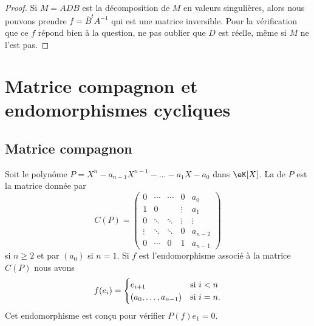 \begin{proof}
    Si \( M=ADB\) est la décomposition de \( M\) en valeurs singulières, alors nous pouvons prendre \( f=\overline{ B }^tA^{-1}\) qui est une matrice inversible. Pour la vérification que ce \( f\) répond bien à la question, ne pas oublier que \( D\) est réelle, même si \( M\) ne l'est pas.
\end{proof}

\section{Matrice compagnon et endomorphismes cycliques}

\subsection{Matrice compagnon}

Soit le polynôme \( P=X^n-a_{n-1}X^{n-1}-\ldots-a_1X-a_0\) dans \( \eK[X]\). La  de \( P\) est la matrice donnée par
\begin{equation}
    C(P)=\begin{pmatrix}
        0    &   \cdots    &   \cdots    &   0    &   a_0\\  
        1    &   0    &       &   \vdots    &   a_1\\  
        0    &   \ddots    &   \ddots    &   \vdots    &   \vdots\\  
        \vdots    &   \ddots    &   \ddots    &   0    &   a_{n-2}\\  
        0    &   \cdots    &   0    &   1    &   a_{n-1}    
    \end{pmatrix}
\end{equation}
si \( n\geq 2\) et par \( (a_0)\) si \( n=1\). Si \( f\) est l'endomorphisme associé à la matrice \( C(P)\) nous avons
\begin{equation}
    f(e_i)=\begin{cases}
        e_{i+1}    &   \text{si \( i<n\)}\\
        (a_0,\ldots, a_{n-1})    &    \text{si \( i=n\)}.
    \end{cases}
\end{equation}
Cet endomorphisme est conçu pour vérifier \( P(f)e_1=0\).

